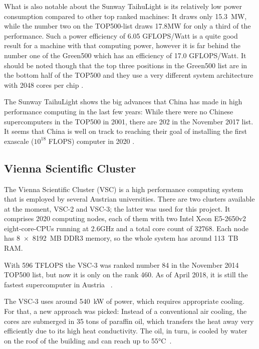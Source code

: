 What is also notable about the Sunway TaihuLight is its relatively low power consumption compared to other top ranked machines: It draws only 15.3~MW, while the number two on the TOP500-list draws 17.8MW for only a third of the performance. Such a power efficiency of 6.05 GFLOPS/Watt is a quite good result for a machine with that computing power, however it is far behind the number one of the Green500 which has an efficiency of 17.0 GFLOPS/Watt. It should be noted though that the top three positions in the Green500 list are in the bottom half of the TOP500 and they use a very different system architecture with 2048 cores per chip \cite{green500}.

The Sunway TaihuLight shows the big advances that China has made in high performance computing in the last few years: While there were no Chinese supercomputers in the TOP500 in 2001, there are 202 in the November 2017 list. It seems that China is well on track to reaching their goal of installing the first exascale ($10^{18}$ FLOPS) computer in 2020 \cite{dongarra2016report}.

\subsection{Vienna Scientific Cluster}
\label{sec:vsc3}

The Vienna Scientific Cluster (VSC) is a high performance computing system that is employed by several Austrian universities. There are two clusters available at the moment, VSC-2 and VSC-3; the latter was used for this project. It comprises 2020 computing nodes, each of them with two Intel Xeon E5-2650v2 eight-core-CPUs running at 2.6GHz and a total core count of 32768. Each node has 8~$\times$~8192~MB DDR3 memory, so the whole system has around 113~TB RAM.

With 596 TFLOPS the VSC-3 was ranked number 84 in the November 2014 TOP500 list, but now it is only on the rank 460.  As of April 2018, it is still the fastest supercomputer in Austria ~\cite{top500n_VSC3}. 

The VSC-3 uses around 540~kW of power, which requires appropriate cooling. For that, a new approach was picked: Instead of a conventional air cooling, the cores are submerged in 35 tons of paraffin oil, which transfers the heat away very efficiently due to its high heat conductivity. The oil, in turn, is cooled by water on the roof of the building and can reach up to 55°C~\cite{vsc_oil}.



